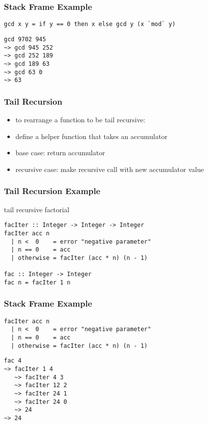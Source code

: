 \documentclass[dvipsnames]{beamer}
\theoremstyle{plain}
\begin{document}
\begin{frame}[fragile]
  \frametitle{Stack Frame Example}

  \begin{exampleblock}{}
    \begin{lstlisting}
gcd x y = if y == 0 then x else gcd y (x `mod` y)
    \end{lstlisting}

    \begin{lstlisting}[frame=single]
gcd 9702 945
~> gcd 945 252
~> gcd 252 189
~> gcd 189 63
~> gcd 63 0
~> 63
    \end{lstlisting}
  \end{exampleblock}
\end{frame}

\begin{frame}
  \frametitle{Tail Recursion}

  \begin{itemize}
    \item to rearrange a function to be tail recursive:

    \medskip
    \item define a helper function that takes an accumulator
    \item base case: return accumulator
    \item recursive case: make recursive call with new accumulator value
  \end{itemize}
\end{frame}

\begin{frame}[fragile]
  \frametitle{Tail Recursion Example}

  \begin{exampleblock}{tail recursive factorial}
    \begin{lstlisting}
facIter :: Integer -> Integer -> Integer
facIter acc n
  | n <  0    = error "negative parameter"
  | n == 0    = acc
  | otherwise = facIter (acc * n) (n - 1)

fac :: Integer -> Integer
fac n = facIter 1 n
    \end{lstlisting}
  \end{exampleblock}
\end{frame}

\begin{frame}[fragile]
  \frametitle{Stack Frame Example}

  \begin{exampleblock}{}
  \begin{lstlisting}
facIter acc n
  | n <  0    = error "negative parameter"
  | n == 0    = acc
  | otherwise = facIter (acc * n) (n - 1)
  \end{lstlisting}

    \begin{lstlisting}[frame=single]
fac 4
~> facIter 1 4
   ~> facIter 4 3
   ~> facIter 12 2
   ~> facIter 24 1
   ~> facIter 24 0
   ~> 24
~> 24
    \end{lstlisting}
  \end{exampleblock}
\end{frame}
\end{document}
